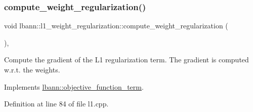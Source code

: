 \subsubsection{\texorpdfstring{compute\+\_\+weight\+\_\+regularization()}{compute\_weight\_regularization()}}
{\footnotesize\ttfamily void lbann\+::l1\+\_\+weight\+\_\+regularization\+::compute\+\_\+weight\+\_\+regularization (\begin{DoxyParamCaption}{ }\end{DoxyParamCaption})\hspace{0.3cm}{\ttfamily [override]}, {\ttfamily [virtual]}}

Compute the gradient of the L1 regularization term. The gradient is computed w.\+r.\+t. the weights. 

Implements \hyperlink{classlbann_1_1objective__function__term_a134cf89caed45527bbe9d811a0b93dfc}{lbann\+::objective\+\_\+function\+\_\+term}.



Definition at line 84 of file l1.\+cpp.


